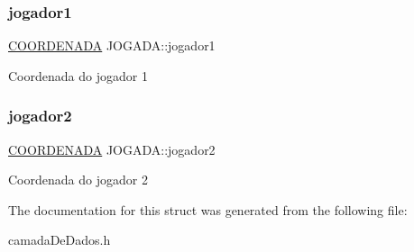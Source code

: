 \subsubsection{\texorpdfstring{jogador1}{jogador1}}
{\footnotesize\ttfamily \hyperlink{structCOORDENADA}{C\+O\+O\+R\+D\+E\+N\+A\+DA} J\+O\+G\+A\+D\+A\+::jogador1}

Coordenada do jogador 1 \mbox{\label{structJOGADA_ab46b16dfbdc7f2af9430c8dcdac0914b}} 
\subsubsection{\texorpdfstring{jogador2}{jogador2}}
{\footnotesize\ttfamily \hyperlink{structCOORDENADA}{C\+O\+O\+R\+D\+E\+N\+A\+DA} J\+O\+G\+A\+D\+A\+::jogador2}

Coordenada do jogador 2 

The documentation for this struct was generated from the following file\+:\begin{DoxyCompactItemize}
\item 
camada\+De\+Dados.\+h\end{DoxyCompactItemize}
